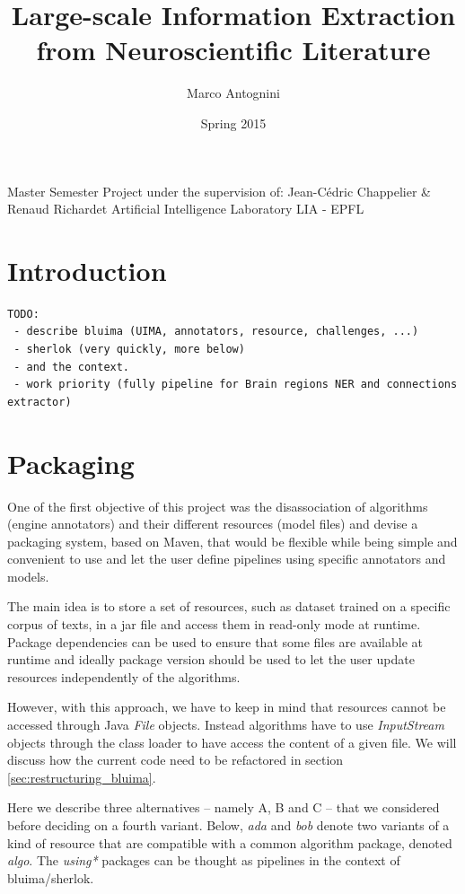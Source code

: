 \documentclass{article}
\title{Large-scale Information Extraction from Neuroscientific Literature}
\date{Spring 2015}
\author{Marco Antognini}
\newcommand{\id}[1]{\mbox{\textit{#1}}}
\begin{document}
\maketitle

Master Semester Project under the supervision of:
Jean-Cédric Chappelier \& 
Renaud Richardet
Artificial Intelligence Laboratory LIA - EPFL

\newpage
{}


\tableofcontents
\newpage

\section{Introduction}

\begin{verbatim}
TODO:
 - describe bluima (UIMA, annotators, resource, challenges, ...)
 - sherlok (very quickly, more below) 
 - and the context.
 - work priority (fully pipeline for Brain regions NER and connections 
extractor)
\end{verbatim}



\section{Packaging}

One of the first objective of this project was the disassociation of algorithms (engine annotators) and their different resources (model files) and devise a packaging system, based on Maven, that would be flexible while being simple and convenient to use and let the user define pipelines using specific annotators and models.

The main idea is to store a set of resources, such as dataset trained on a specific corpus of texts, in a jar file and access them in read-only mode at runtime. Package dependencies can be used to ensure that some files are available at runtime and ideally package version should be used to let the user update resources independently of the algorithms.

However, with this approach, we have to keep in mind that resources cannot be accessed through Java \id{File} objects. Instead algorithms have to use \id{InputStream} objects through the class loader to have access the content of a given file. We will discuss how the current code need to be refactored in section \ref{sec:restructuring_bluima}.

Here we describe three alternatives -- namely A, B and C -- that we considered before deciding on a fourth variant. Below, \id{ada} and \id{bob} denote two variants of a kind of resource that are compatible with a common algorithm package, denoted \id{algo}. The \id{using*} packages can be thought as pipelines in the context of bluima/sherlok.
\end{document}
